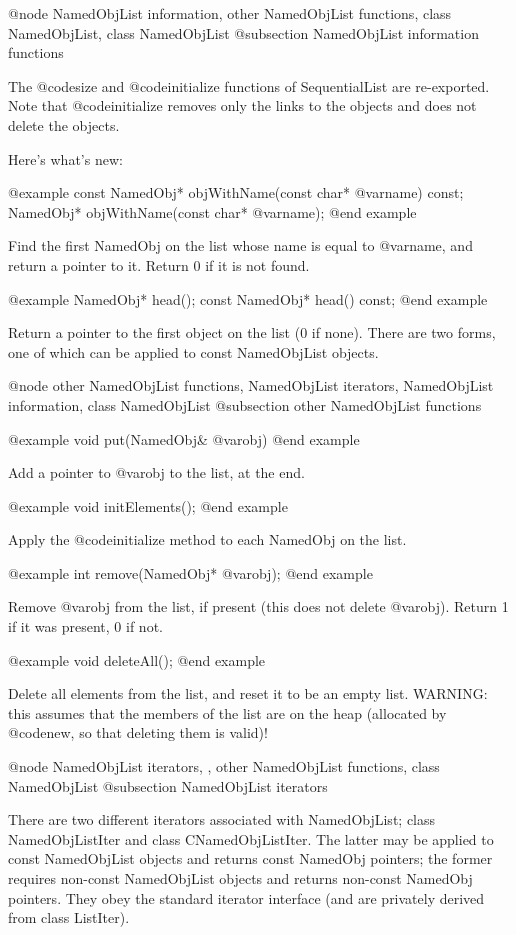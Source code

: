 @node NamedObjList information, other NamedObjList functions, class NamedObjList, class NamedObjList
@subsection NamedObjList information functions

The @code{size} and @code{initialize} functions of SequentialList
are re-exported.  Note that @code{initialize} removes only the links
to the objects and does not delete the objects.

Here's what's new:

@example
const NamedObj* objWithName(const char* @var{name}) const;
NamedObj* objWithName(const char* @var{name});
@end example

Find the first NamedObj on the list whose name is equal to @var{name},
and return a pointer to it.  Return 0 if it is not found.

@example
NamedObj* head();
const NamedObj* head() const;
@end example

Return a pointer to the first object on the list (0 if none).  There
are two forms, one of which can be applied to const NamedObjList objects.

@node other NamedObjList functions, NamedObjList iterators, NamedObjList information, class NamedObjList
@subsection other NamedObjList functions

@example
void put(NamedObj& @var{obj})
@end example

Add a pointer to @var{obj} to the list, at the end.

@example
void initElements();
@end example

Apply the @code{initialize} method to each NamedObj on the list.

@example
int remove(NamedObj* @var{obj});
@end example

Remove @var{obj} from the list, if present (this does not delete
@var{obj}).  Return 1 if it was present, 0 if not.

@example
void deleteAll();
@end example

Delete all elements from the list, and reset it to be an empty list.
WARNING: this assumes that the members of the list are on the heap
(allocated by @code{new}, so that deleting them is valid)!

@node NamedObjList iterators,  , other NamedObjList functions, class NamedObjList
@subsection NamedObjList iterators

There are two different iterators associated with NamedObjList;
class NamedObjListIter and class CNamedObjListIter.  The latter may
be applied to const NamedObjList objects and returns const NamedObj
pointers; the former requires non-const NamedObjList objects and
returns non-const NamedObj pointers.  They obey the standard iterator
interface (and are privately derived from class ListIter).

